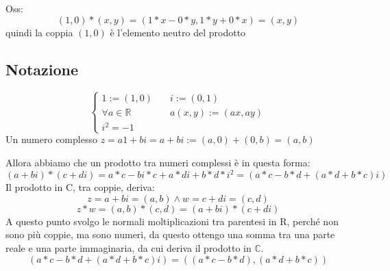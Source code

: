 \documentclass[a4paper,12pt]{article}
\begin{document}
	Oss: 
	\[(1, 0) * (x, y) = (1 * x - 0 * y, 1 * y + 0 * x) = (x, y)\]
	quindi la coppia $(1, 0)$ è l'elemento neutro del prodotto
	
	\subsection{Notazione}
	\[
	\left\{
	\begin{aligned}
		1:= (1, 0) \quad & i := (0, 1) \\
		\forall a \in \mathbb{R} \quad \quad & a(x, y) :=(ax, ay) \\
		i^2 = -1 \quad \;\;\;& 
	\end{aligned}
	\right.
	\]
	Un numero complesso $z = a1 + bi = a + bi := (a, 0) + (0, b) = (a, b)$
	
	Allora abbiamo che un prodotto tra numeri complessi è in questa forma:
	\[(a + bi) * (c + di) = a * c - bi * c + a * di + b * d * i^2 = (a*c - b*d + (a*d + b*c)i)\]
	Il prodotto in C, tra coppie, deriva:
	\[z = a + bi = (a, b) \wedge w = c + di = (c, d)\] 
	\[z * w = (a, b) * (c, d) = (a + bi) * (c + di)\]
	A questo punto svolgo le normali moltiplicazioni tra parentesi in R, perché non sono più coppie, ma sono numeri,  da questo ottengo una somma tra una parte reale e una parte immaginaria, da cui deriva il prodotto in $\mathbb{C}$.
	\[(a*c - b*d + (a*d + b*c)i) = ((a*c - b*d), (a*d + b*c))\]
	
\end{document}
